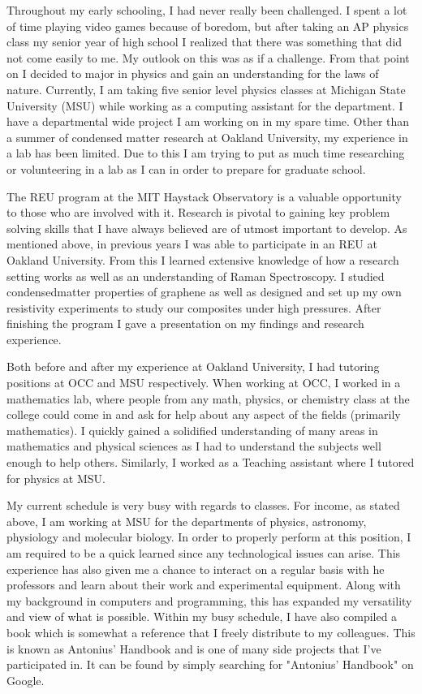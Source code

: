 \documentclass[11pt,a4paper,sans]{moderncv} %
\begin{document}
\hspace{1cm}Throughout my early schooling, I had never really been challenged. I spent a lot of time playing video games because of boredom, but after taking an AP physics class my senior year of high school I realized that there was something that did not come easily to me. My outlook on this was as if a challenge. From that point on I decided to major in physics and gain an understanding for the laws of nature. Currently, I am taking five senior level physics classes at Michigan State University (MSU) while working as a computing assistant for the department. I have a departmental wide project I am working on in my spare time. Other than a summer of condensed matter research at Oakland University, my experience in a lab has been limited. Due to this I am trying to put as much time researching or volunteering in a lab as I can in order to prepare for graduate school.

\hspace{1cm} The REU program at the MIT Haystack Observatory is a valuable opportunity to those who are involved with it. Research is pivotal to gaining key problem solving skills that I have always believed are of utmost important to develop. As mentioned above, in previous years I was able to participate in an REU at Oakland University. From this I learned extensive knowledge of how a research setting works as well as an understanding of Raman Spectroscopy. I studied condensed\newpage matter properties of graphene as well as designed and set up my own resistivity experiments to study our composites under high pressures. After finishing the program I gave a presentation on my findings and research experience.

\hspace{1cm} Both before and after my experience at Oakland University, I had tutoring positions at OCC and MSU respectively. When working at OCC, I worked in a mathematics lab, where people from any math, physics, or chemistry class at the college could come in and ask for help about any aspect of the fields (primarily mathematics). I quickly gained a solidified understanding of many areas in mathematics and physical sciences as I had to understand the subjects well enough to help others. Similarly, I worked as a Teaching assistant where I tutored for physics at MSU.

\hspace{1cm} My current schedule is very busy with regards to classes. For income, as stated above, I am working at MSU for the departments of physics, astronomy, physiology and molecular biology. In order to properly perform at this position, I am required to be a quick learned since any technological issues can arise. This experience has also given me a chance to interact on a regular basis with he professors and learn about their work and experimental equipment. Along with my background in computers and programming, this has expanded my versatility and view of what is possible. Within my busy schedule, I have also compiled a book which is somewhat a reference that I freely distribute to my colleagues. This is known as Antonius' Handbook and is one of many side projects that I've participated in. It can be found by simply searching for "Antonius' Handbook" on Google.
\end{document}
